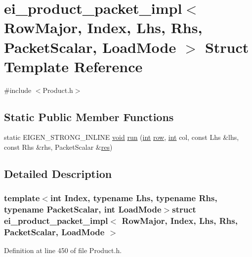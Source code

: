 \hypertarget{structei__product__packet__impl_3_01_row_major_00_01_index_00_01_lhs_00_01_rhs_00_01_packet_scalar_00_01_load_mode_01_4}{\section{ei\-\_\-product\-\_\-packet\-\_\-impl$<$ Row\-Major, Index, Lhs, Rhs, Packet\-Scalar, Load\-Mode $>$ Struct Template Reference}
\label{structei__product__packet__impl_3_01_row_major_00_01_index_00_01_lhs_00_01_rhs_00_01_packet_scalar_00_01_load_mode_01_4}
}


{\ttfamily \#include $<$Product.\-h$>$}

\subsection*{Static Public Member Functions}
\begin{DoxyCompactItemize}
\item 
static E\-I\-G\-E\-N\-\_\-\-S\-T\-R\-O\-N\-G\-\_\-\-I\-N\-L\-I\-N\-E \hyperlink{group___u_a_v_objects_plugin_ga444cf2ff3f0ecbe028adce838d373f5c}{void} \hyperlink{structei__product__packet__impl_3_01_row_major_00_01_index_00_01_lhs_00_01_rhs_00_01_packet_scalar_00_01_load_mode_01_4_a6051584817e9647bbf31755709248272}{run} (\hyperlink{ioapi_8h_a787fa3cf048117ba7123753c1e74fcd6}{int} \hyperlink{glext_8h_a11b277b422822f784ee248b43eee3e1e}{row}, \hyperlink{ioapi_8h_a787fa3cf048117ba7123753c1e74fcd6}{int} col, const Lhs \&lhs, const Rhs \&rhs, Packet\-Scalar \&\hyperlink{glext_8h_a1dbb21208b9047cc8031ca9c840d3c2f}{res})
\end{DoxyCompactItemize}


\subsection{Detailed Description}
\subsubsection*{template$<$int Index, typename Lhs, typename Rhs, typename Packet\-Scalar, int Load\-Mode$>$struct ei\-\_\-product\-\_\-packet\-\_\-impl$<$ Row\-Major, Index, Lhs, Rhs, Packet\-Scalar, Load\-Mode $>$}



Definition at line 450 of file Product.\-h.




